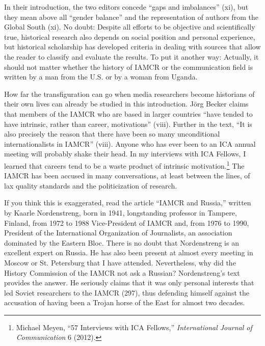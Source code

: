 \documentclass{tufte-handout}
\begin{document}
In their introduction, the two editors concede ``gaps and imbalances''
(xi), but they mean above all ``gender balance'' and the representation
of authors from the Global South (xi). No doubt: Despite all efforts to
be objective and scientifically true, historical research also depends
on social position and personal experience, but historical scholarship
has developed criteria in dealing with sources that allow the reader to
classify and evaluate the results. To put it another way: Actually, it
should not matter whether the history of IAMCR or the communication
field is written by a man from the U.S. or by a woman from Uganda.

How far the transfiguration can go when media researchers become
historians of their own lives can already be studied in this
introduction. Jörg Becker claims that members of the IAMCR who are based
in larger countries ``have tended to have intrinsic, rather than career,
motivations'' (viii). Further in the text, ``It is also precisely the
reason that there have been so many unconditional internationalists in
IAMCR'' (viii). Anyone who has ever been to an ICA annual meeting will
probably shake their head. In my interviews with ICA Fellows, I learned
that careers tend to be a waste product of intrinsic
motivation.\footnote{Michael Meyen, ``57 Interviews with ICA Fellows,''
  \emph{International Journal of Communication} 6 (2012).} The IAMCR has
been accused in many conversations, at least between the lines, of lax
quality standards and the politicization of research.

If you think this is exaggerated, read the article ``IAMCR and Russia,''
written by Kaarle Nordenstreng, born in 1941, longstanding professor in
Tampere, Finland, from 1972 to 1988 Vice-President of IAMCR and, from
1976 to 1990, President of the International Organization of
Journalists, an association dominated by the Eastern Bloc. There is no
doubt that Nordenstreng is an excellent expert on Russia. He has also
been present at almost every meeting in Moscow or St. Petersburg that I
have attended. Nevertheless, why did the History Commission of the IAMCR
not ask a Russian? Nordenstreng's text provides the answer. He seriously
claims that it was only personal interests that led Soviet researchers
to the IAMCR (297), thus defending himself against the accusation of
having been a Trojan horse of the East for almost two decades.
\end{document}
